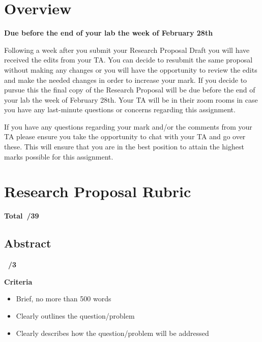 \documentclass[
]{book}
\providecommand{\tightlist}{%
  \setlength{\itemsep}{0pt}\setlength{\parskip}{0pt}}
\begin{document}
\hypertarget{overview-1}{%
\section*{Overview}\label{overview-1}}

\textbf{Due before the end of your lab the week of February 28th}

Following a week after you submit your Research Proposal Draft you will have received the edits from your TA. You can decide to resubmit the same proposal without making any changes or you will have the opportunity to review the edits and make the needed changes in order to increase your mark. If you decide to pursue this the final copy of the Research Proposal will be due before the end of your lab the week of February 28th. Your TA will be in their zoom rooms in case you have any last-minute questions or concerns regarding this assignment.

If you have any questions regarding your mark and/or the comments from your TA please ensure you take the opportunity to chat with your TA and go over these. This will ensure that you are in the best position to attain the highest marks possible for this assignment.

\hypertarget{research-proposal-rubric}{%
\section*{Research Proposal Rubric}\label{research-proposal-rubric}}

\textbf{Total~/39}

\hypertarget{abstract}{%
\subsection*{Abstract}\label{abstract}}

\textbf{~/3}

\textbf{Criteria}

\begin{itemize}
\tightlist
\item
  Brief, no more than 500 words
\item
  Clearly outlines the question/problem
\item
  Clearly describes how the question/problem will be addressed
\end{itemize}
\end{document}
